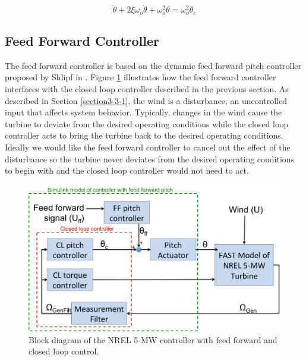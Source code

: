 \begin{equation}
	\ddot{\theta } + 2\xi \omega_o \dot{\theta} + \omega_{o}^{2}\theta = \omega_{o}^{2}\theta_c \label{eq3-1}
\end{equation}




\subsection{Feed Forward Controller} \label{section3-3-3}

The feed forward controller is based on the dynamic feed forward pitch controller proposed by Shlipf in \cite{schlipf2010}. Figure \ref{fig3-10} illustrates how the feed forward controller interfaces with the closed loop controller described in the previous section. As described in Section \ref{section3-3-1}, the wind is a disturbance, an uncontrolled input that affects system behavior. Typically, changes in the wind cause the turbine to deviate from the desired operating conditions while the closed loop controller acts to bring the turbine back to the desired operating conditions. Ideally we would like the feed forward controller to cancel out the effect of the disturbance so the turbine never deviates from the desired operating conditions to begin with and the closed loop controller would not need to act.

 \begin{figure}[htbp]
	\centering
		\includegraphics[width=\linewidth]{Figures/ch3Figures/fig3-10.png}
		
	\caption{Block diagram of the NREL 5-MW controller with feed forward and closed loop control.}
	\label{fig3-10}
\end{figure}

